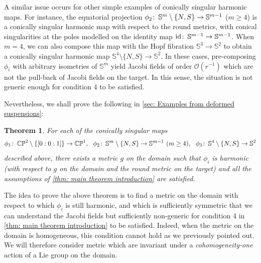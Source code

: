 \documentclass{article}
\numberwithin{equation}{section}        %
\theoremstyle{bfnote}
\newtheorem{thm}{Theorem}[section]          %
\theoremstyle{definition}
\theoremstyle{bfremark}
\newcommand{\col}{\colon \thinspace}        %
\newcommand{\Sp}{\mathbb{S}}                %
\DeclareMathOperator{\id}{id}                   %
\begin{document}
A similar issue occurs for other simple examples of conically singular harmonic maps. For instance, the equatorial projection $\phi_2 \col \Sp^{m} \setminus \{N,S\} \to \Sp^{m-1}$ ($m \geq 4$) is a conically singular harmonic map with respect to the round metrics, with conical singularities at the poles modelled on the identity map $\id \col \Sp^{m-1} \to \Sp^{m-1}$. When $m = 4$, we can also compose this map with the Hopf fibration $\Sp^3 \to \Sp^2$ to obtain a conically singular harmonic map $\Sp^4 \setminus \{N,S\} \to \Sp^2$. In these cases, pre-composing $\phi_i$ with arbitrary isometries of $\Sp^{m}$ yield Jacobi fields of order $\mathcal{O}(r^{-1})$ which are not the pull-back of Jacobi fields on the target. In this sense, the situation is not generic enough for condition 4 to be satisfied.

Nevertheless, we shall prove the following in \cref{sec: Examples from deformed suspensions}:

\begin{thm}     \label{thm: examples intro}
    For each of the conically singular maps
    \begin{equation*}
        \phi_1 \col \mathbb{CP}^2 \setminus \{[0:0:1]\} \to \mathbb{CP}^1, ~~ \phi_2 \col \Sp^m \setminus \{N,S\} \to \Sp^{m-1} ~ (m \geq 4), ~~ \phi_3 \col \Sp^4 \setminus \{N,S\} \to \Sp^2
    \end{equation*}
    described above, there exists a metric $g$ on the domain such that $\phi_i$ is harmonic (with respect to $g$ on the domain and the round metric on the target) and all the assumptions of \cref{thm: main theorem introduction} are satisfied.
\end{thm}

The idea to prove the above theorem is to find a metric on the domain with respect to which $\phi_i$ is still harmonic, and which is sufficiently symmetric that we can understand the Jacobi fields but sufficiently non-generic for condition 4 in \cref{thm: main theorem introduction} to be satisfied. Indeed, when the metric on the domain is homogeneous, this condition cannot hold as we previously pointed out. We will therefore consider metric which are invariant under a \emph{cohomogeneity-one} action of a Lie group on the domain.
\end{document}
